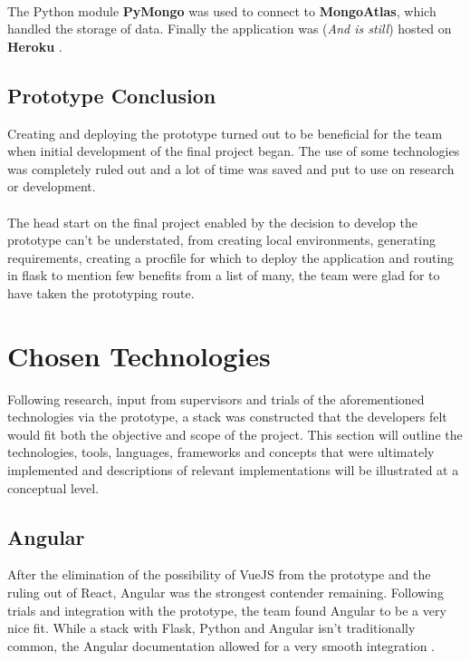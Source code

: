 \paragraph{}
The Python module \textbf{PyMongo} was used to connect to \textbf{MongoAtlas}, which handled the storage of data. Finally the application was (\textit{And is still}) hosted on \textbf{Heroku} \cite{PROTOTYPE_HEROKU}. 

\subsection{Prototype Conclusion}
Creating and deploying the prototype turned out to be beneficial for the team when initial development of the final project began. The use of some technologies was completely ruled out and a lot of time was saved and put to use on research or development. 

\paragraph{}
The head start on the final project enabled by the decision to develop the prototype can't be understated, from creating local environments, generating requirements, creating a procfile for which to deploy the application and routing in flask to mention few benefits from a list of many, the team were glad for to have taken the prototyping route.

\section{Chosen Technologies}
Following research, input from supervisors and trials of the aforementioned technologies via the prototype, a stack was constructed that the developers felt would fit both the objective and scope of the project. This section will outline the technologies, tools, languages, frameworks and concepts that were ultimately implemented and descriptions of relevant implementations will be illustrated at a conceptual level.

\subsection{Angular}
After the elimination of the possibility of VueJS from the prototype and the ruling out of React, Angular was the strongest contender remaining. Following trials and integration with the prototype, the team found Angular to be a very nice fit. While a stack with Flask, Python and Angular isn't traditionally common, the Angular documentation allowed for a very smooth integration \cite{ANGULAR_DOCUMENTATION}.

